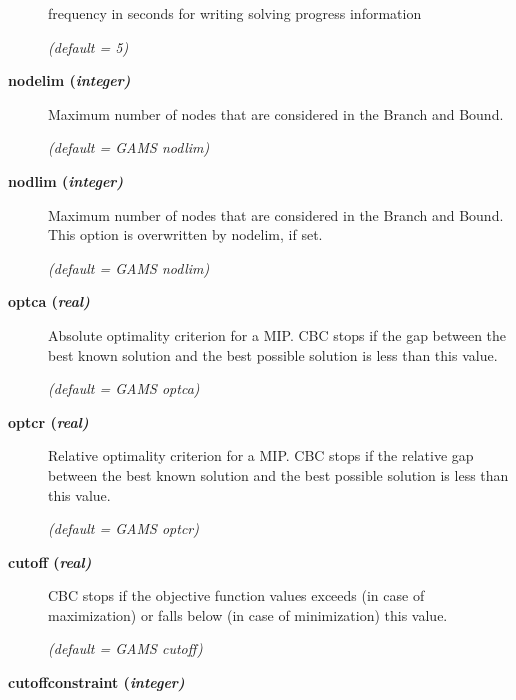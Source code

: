 \begin{description}
frequency in seconds for writing solving progress information

\textsl{(default = 5)}

\item[\label{nodelim}\hypertarget{nodelim}
{\textbf{nodelim (\slshape{integer})}}]\hspace{1.0in}

Maximum number of nodes that are considered in the Branch and Bound.

\textsl{(default = GAMS nodlim)}

\item[\label{nodlim}\hypertarget{nodlim}
{\textbf{nodlim (\slshape{integer})}}]\hspace{1.0in}

Maximum number of nodes that are considered in the Branch and Bound.
This option is overwritten by nodelim, if set.

\textsl{(default = GAMS nodlim)}

\item[\label{optca}\hypertarget{optca}
{\textbf{optca (\slshape{real})}}]\hspace{1.0in}

Absolute optimality criterion for a MIP.
CBC stops if the gap between the best known solution and the best possible solution is less than this value.

\textsl{(default = GAMS optca)}

\item[\label{optcr}\hypertarget{optcr}
{\textbf{optcr (\slshape{real})}}]\hspace{1.0in}

Relative optimality criterion for a MIP.
CBC stops if the relative gap between the best known solution and the best possible solution is less than this value.

\textsl{(default = GAMS optcr)}

\item[\label{cutoff}\hypertarget{cutoff}
{\textbf{cutoff (\slshape{real})}}]\hspace{1.0in}

CBC stops if the objective function values exceeds (in case of maximization) or falls below (in case of minimization) this value.

\textsl{(default = GAMS cutoff)}

\item[\label{cutoffconstraint}\hypertarget{cutoffconstraint}
{\textbf{cutoffconstraint (\slshape{integer})}}]\hspace{1.0in}


\end{description}
